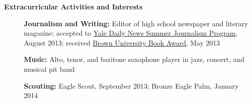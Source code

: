 \documentclass[letterpaper,10.6pt]{article}
\newcommand{\resheading}[1]{{\large \colorbox{mygrey}{\begin{minipage}{\textwidth}{\textbf{#1 \vphantom{p\^{E}}}}\end{minipage}}}}
\begin{document}
\resheading{Extracurricular Activities and Interests}
	\begin{description}
		\item[] \hspace{0.03in} \textbf{Journalism and Writing:} { \footnotesize Editor of high school newspaper and literary magazine; accepted to \href{http://yaledailynews.com/about-us/sjp/}{Yale Daily News Summer Journalism Program}, August 2013; received \href{http://www.brown.edu/campus-life/support/bookstore/book-award}{Brown University Book Award}, May 2013}
		\item[] \hspace{0.03in} \textbf{Music:} {\footnotesize Alto, tenor, and baritone saxophone player in jazz, concert, and musical pit band}
		\item[] \hspace{0.03in} \textbf{Scouting:} {\footnotesize Eagle Scout, September 2013; Bronze Eagle Palm, January 2014}
	\end{description}
\end{document}
